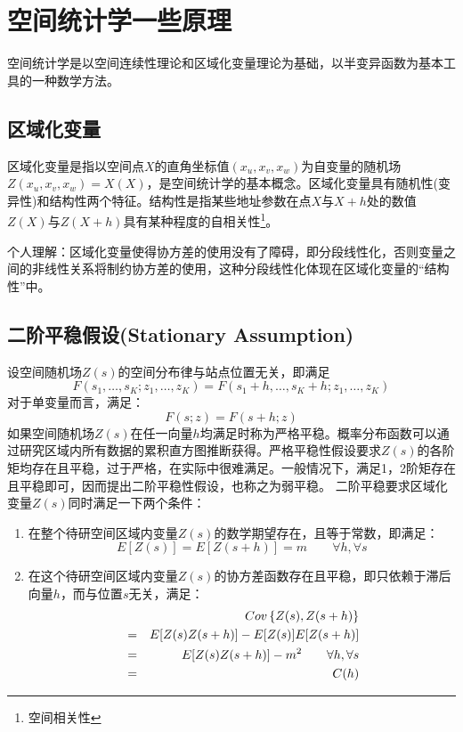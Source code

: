 \section{空间统计学一些原理}
空间统计学是以空间连续性理论和区域化变量理论为基础，以半变异函数为基本工具的一种数学方法。


\subsection{区域化变量}
区域化变量是指以空间点$X$的直角坐标值$(x_u,x_v,x_w)$为自变量的随机场$Z(x_u,x_v,x_w) = X(X)$，是空间统计学的基本概念。区域化变量具有随机性(变异性)和结构性两个特征。结构性是指某些地址参数在点$X$与$X+h$处的数值$Z(X)$与$Z(X+h)$具有某种程度的自相关性\footnote{空间相关性}。
\begin{note}
    个人理解：区域化变量使得协方差的使用没有了障碍，即分段线性化，否则变量之间的非线性关系将制约协方差的使用，这种分段线性化体现在区域化变量的``结构性''中。
\end{note}




\subsection{二阶平稳假设(Stationary Assumption)}
设空间随机场$Z(s)$的空间分布律与站点位置无关，即满足
\begin{equation}
    F(s_1,\dots,s_K;z_1,\dots,z_K) = F(s_1+h,\dots,s_K+h;z_1,\dots,z_K)
    \label{eq-staionary1}
\end{equation}
对于单变量而言，满足：
\begin{equation}
    F(s;z) = F(s+h;z)
    \label{eq-staionary2}
\end{equation}
如果空间随机场$Z(s)$在任一向量$h$均满足时称为严格平稳。\textcolor[rgb]{1,0,0}{概率分布函数可以通过研究区域内所有数据的累积直方图推断获得}。严格平稳性假设要求$Z(s)$的各阶矩均存在且平稳，过于严格，在实际中很难满足。一般情况下，满足1，2阶矩存在且平稳即可，因而提出二阶平稳性假设，也称之为\textcolor[rgb]{1,0,0}{弱平稳}。
二阶平稳要求区域化变量$Z(s)$同时满足一下两个条件：
\begin{enumerate}
    \item 在整个待研空间区域内变量$Z(s)$的数学期望存在，且等于常数，即满足：
        \begin{equation}
            E[Z(s)] = E[Z(s+h)] = m \qquad \forall h, \forall s
            \label{eq-stationarycondition1}
        \end{equation}
    \item 在这个待研空间区域内变量$Z(s)$的协方差函数存在且平稳，即只依赖于滞后向量$h$，而与位置$s$无关，满足：
        \begin{eqnarray}
            &&Cov\left\{ Z(s),Z(s+h) \right\} \notag \\
            &=& E[Z(s)Z(s+h)] - E[Z(s)]E[Z(s+h)] \notag \\
            &=& E[Z(s)Z(s+h)]-m^2 \qquad \forall h,\forall s \\
            &=& C(h) \notag
            \label{eq-stationarycondition2}
        \end{eqnarray}
\end{enumerate}

